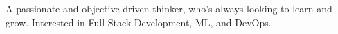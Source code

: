 

\begin{cvparagraph}

A passionate and objective driven thinker, who's always looking to learn and 
grow. Interested in Full Stack Development, ML, and DevOps.
\end{cvparagraph}
